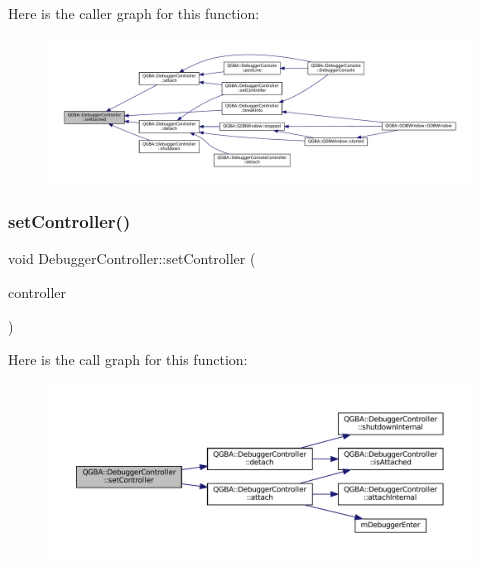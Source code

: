 Here is the caller graph for this function\+:
\nopagebreak
\begin{figure}[H]
\begin{center}
\leavevmode
\includegraphics[width=350pt]{class_q_g_b_a_1_1_debugger_controller_aed5edc4c60b5c87a2a37c29079665f03_icgraph}
\end{center}
\end{figure}
\mbox{\label{class_q_g_b_a_1_1_debugger_controller_a6be5bfa5408023233de61151d4697519}} 
\subsubsection{\texorpdfstring{set\+Controller()}{setController()}}
{\footnotesize\ttfamily void Debugger\+Controller\+::set\+Controller (\begin{DoxyParamCaption}\item[{std\+::shared\+\_\+ptr$<$ \mbox{\hyperlink{class_q_g_b_a_1_1_core_controller}{Core\+Controller}} $>$}]{controller }\end{DoxyParamCaption})}

Here is the call graph for this function\+:
\nopagebreak
\begin{figure}[H]
\begin{center}
\leavevmode
\includegraphics[width=350pt]{class_q_g_b_a_1_1_debugger_controller_a6be5bfa5408023233de61151d4697519_cgraph}
\end{center}
\end{figure}
\mbox{\label{class_q_g_b_a_1_1_debugger_controller_a63d465bde2ae7098a041e195e96e88e6}} 
